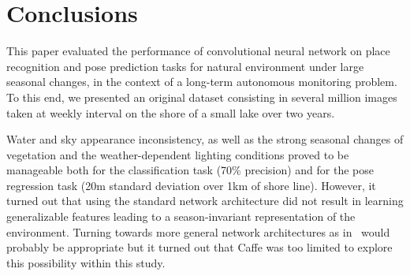 \section{Conclusions}
This paper evaluated the performance of convolutional neural network on place
recognition and pose prediction tasks for natural environment under large
seasonal changes, in the context of a long-term autonomous monitoring problem.
To this end, we presented an original dataset consisting in several million
images taken at weekly interval on the shore of a small lake over two years. 

Water and sky appearance inconsistency, as well as the strong seasonal changes
of vegetation and the weather-dependent lighting conditions proved to be
manageable both for the classification task (70\% precision) and for the pose
regression task (20m standard deviation over 1km of shore line). However, it
turned out that using the standard network architecture did not result in
learning generalizable features leading to a season-invariant representation of
the environment. Turning towards more general network architectures as
in~\cite{radford2016} would probably be appropriate but it turned out that
Caffe was too limited to explore this possibility within this study.
